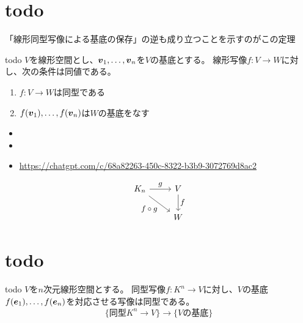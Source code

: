 \documentclass[../../../topic_linear-algebra]{subfiles}
\begin{document}
\sectionline
\section{todo}

\begin{mindflow}
  「線形同型写像による基底の保存」の逆も成り立つことを示すのがこの定理
\end{mindflow}

\begin{theorem*}{todo}
  $V$を線形空間とし、$\vb*{v}_1, \ldots, \vb*{v}_n$を$V$の基底とする。
  線形写像$f \colon V \to W$に対し、次の条件は同値である。
  \begin{enumerate}[label=\romanlabel]
    \item $f\colon V \to W$は同型である
    \item $f(\vb*{v}_1), \ldots, f(\vb*{v}_n)$は$W$の基底をなす
  \end{enumerate}
\end{theorem*}

\begin{mindflow}
  \begin{itemize}
    \item {}
    \item {}
    \item \url{https://chatgpt.com/c/68a82263-450c-8322-b3b9-3072769d8ac2}
  \end{itemize}
\end{mindflow}

\begin{equation*}
  \begin{tikzcd}[every label/.append style = {font = \small}]
    K_n \arrow[r,"g"]\arrow[rd, "f \circ g"'] & V \arrow[d,"f"]\\
    & W
  \end{tikzcd}
\end{equation*}

\sectionline
\section{todo}

\begin{theorem*}{todo}
  $V$を$n$次元線形空間とする。
  同型写像$f\colon K^n \to V$に対し、$V$の基底$f(\vb*{e}_1), \ldots, f(\vb*{e}_n)$を対応させる写像は同型である。
  \begin{equation*}
    \{\text{同型} K^n \to V \} \to \{ V\text{の基底}\}
  \end{equation*}
\end{theorem*}
\end{document}
